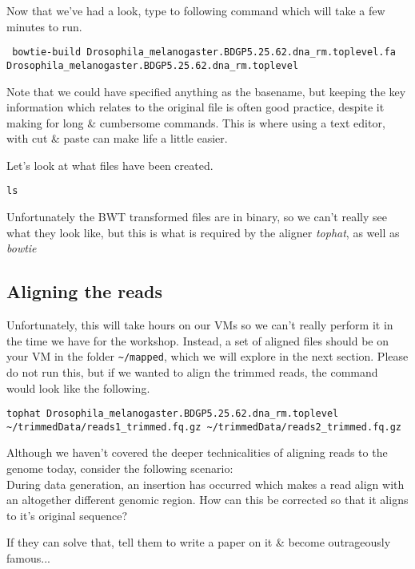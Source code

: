 \begin{steps}
Now that we've had a look, type to following command which will take a few minutes to run.
\begin{lstlisting}
 bowtie-build Drosophila_melanogaster.BDGP5.25.62.dna_rm.toplevel.fa Drosophila_melanogaster.BDGP5.25.62.dna_rm.toplevel
\end{lstlisting}
Note that we could have specified anything as the basename, but keeping the key information which relates to the original file is often good practice, despite it making for long \& cumbersome commands.
This is where using a text editor, with cut \& paste can make life a little easier.
\end{steps}

\begin{steps}
Let's look at what files have been created.
\begin{lstlisting}
ls
\end{lstlisting}
Unfortunately the BWT transformed files are in binary, so we can't really see what they look like, but this is what is required by the aligner \textit{tophat}, as well as \textit{bowtie} 
\end{steps}

\subsection{Aligning the reads}
Unfortunately, this will take hours on our VMs so we can't really perform it in the time we have for the workshop.
Instead, a set of aligned files should be on your VM in the folder \texttt{\~{}/mapped}, which we will explore in the next section.
Please do not run this, but if we wanted to align the trimmed reads, the command would look like the following.
\begin{lstlisting}
tophat Drosophila_melanogaster.BDGP5.25.62.dna_rm.toplevel  ~/trimmedData/reads1_trimmed.fq.gz ~/trimmedData/reads2_trimmed.fq.gz
\end{lstlisting}

\begin{advanced}
\begin{questions}
Although we haven't covered the deeper technicalities of aligning reads to the genome today, consider the following scenario:\\

During data generation, an insertion has occurred which makes a read align with an altogether different genomic region.
How can this be corrected so that it aligns to it's original sequence? \\
\begin{answer}
If they can solve that, tell them to write a paper on it \& become outrageously famous...
\end{answer}
\end{questions}
\end{advanced}
